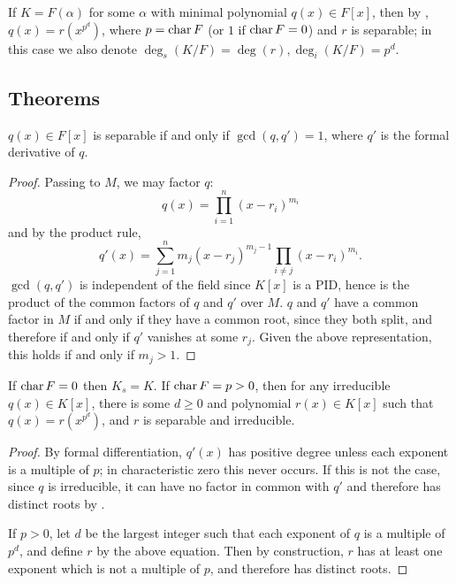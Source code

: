 \begin{definition} If $K = F(\alpha)$ for some $\alpha$ with minimal polynomial
$q(x) \in F[x]$, then by , $q(x) = r(x^{p^d})$, where $p =
\operatorname{\text{char}}{F}$ (or $1$ if $\operatorname{\text{char}}{F} = 0$) and $r$ is separable; in this case we
also denote $\deg_s(K/F) = \deg(r), \deg_i(K/F) = p^d$.  \label{def:prim_sep}
\end{definition}

\subsection{Theorems}

\begin{lemma} $q(x) \in F[x]$ is separable if and only if $\gcd(q, q') = 1$,
where $q'$ is the formal derivative of $q$. 
\label{der_poly}
\end{lemma}

\begin{proof} Passing to $M$, we may factor $q$:
\begin{equation*}
q(x) = \prod_{i = 1}^n (x - r_i)^{m_i}
\end{equation*}
and by the product rule,
\begin{equation*}
q'(x) = \sum_{j = 1}^n m_j (x - r_j)^{m_j - 1} \prod_{i \neq j} (x -
	r_i)^{m_i}.
\end{equation*}
$\gcd(q, q')$ is independent of the field since $K[x]$ is a PID, hence is the
product of the common factors of $q$ and $q'$ over $M$.  $q$ and $q'$ have a
common factor in $M$ if and only if they have a common root, since they both
split, and therefore if and only if $q'$ vanishes at some $r_j$.  Given the
above representation, this holds if and only if $m_j > 1$. \end{proof}

\begin{lemma} If $\operatorname{\text{char}}{F} = 0$ then $K_s = K$.  If $\operatorname{\text{char}}{F} = p > 0$, then for
any irreducible $q(x) \in K[x]$, there is some $d \geq 0$ and polynomial $r(x)
\in K[x]$ such that $q(x) = r(x^{p^d})$, and $r$ is separable and irreducible.
\label{sep_poly}
\end{lemma}

\begin{proof} By formal differentiation, $q'(x)$ has positive degree unless
each exponent is a multiple of $p$; in characteristic zero this never occurs.
If this is not the case, since $q$ is irreducible, it can have no factor in
common with $q'$ and therefore has distinct roots by .

If $p > 0$, let $d$ be the largest integer such that each exponent of $q$ is a
multiple of $p^d$, and define $r$ by the above equation.  Then by
construction, $r$ has at least one exponent which is not a multiple of $p$,
and therefore has distinct roots. \end{proof}

